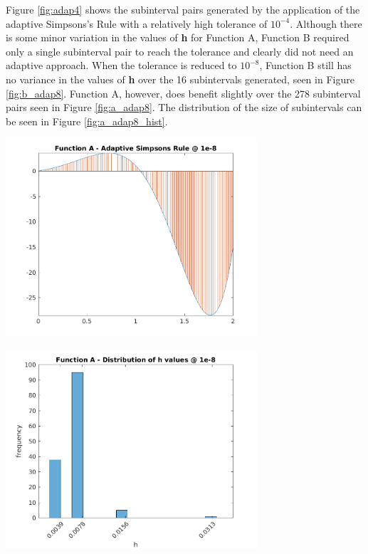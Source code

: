 \documentclass{article}
\begin{document}
Figure \ref{fig:adap4} shows the subinterval pairs generated by the application of the adaptive Simpsons's Rule with a relatively high tolerance of $10^{-4}$. Although there is some minor variation in the values of \textbf{h} for Function A, Function B required only a single subinterval pair to reach the tolerance and clearly did not need an adaptive approach. When the tolerance is reduced to $10^{-8}$, Function B still has no variance in the values of \textbf{h} over the 16 subintervals generated, seen in Figure \ref{fig:b_adap8}. Function A, however, does benefit slightly over the 278 subinterval pairs seen in Figure \ref{fig:a_adap8}. The distribution of the size of subintervals can be seen in Figure \ref{fig:a_adap8_hist}.


\begin{center}
	\includegraphics[width=0.7\textwidth]{../output/a_adaptive_simpsons_8.png}
	\label{fig:a_adap8}
\end{center}

\begin{center}
	\includegraphics[width=0.7\textwidth]{../output/a_adaptive_simpsons_8_hist.png}
	\label{fig:a_adap8_hist}
\end{center}
\end{document}
